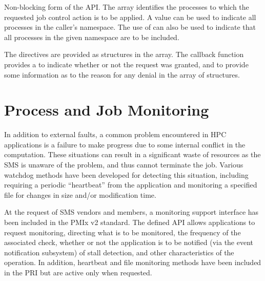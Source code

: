 \optattrend

\descr

Non-blocking form of the  \ac{API}.
The  array identifies the processes to which the requested job control action is to be applied.
A  value can be used to indicate all processes in the caller's namespace.
The use of  can also be used to indicate that all processes in the given namespace are to be included.

The directives are provided as  structures in the  array.
The callback function provides a  to indicate whether or not the request was granted, and to provide some information as to the reason for any denial in the  array of  structures.



\section{Process and Job Monitoring}
\label{chap:api_job_mgmt:monitor}

In addition to external faults, a common problem encountered in \ac{HPC} applications is a failure to make
progress due to some internal conflict in the computation. These situations can
result in a significant waste of resources as the \ac{SMS} is unaware of the problem, and thus cannot terminate the
job. Various watchdog methods have been developed for detecting this situation, including requiring a periodic ``heartbeat''
from the application and monitoring a specified file for changes in size and/or modification time.

At the request of \ac{SMS} vendors and members, a monitoring support interface has been included in the PMIx v2 standard. The defined \ac{API} allows applications to request monitoring, directing what is to be monitored, the frequency of the associated check, whether or not the application is to be notified (via the event notification subsystem) of stall detection, and other characteristics of the operation. In addition, heartbeat and file monitoring methods have been included in the \ac{PRI} but are active only when requested.

\subsection{}

